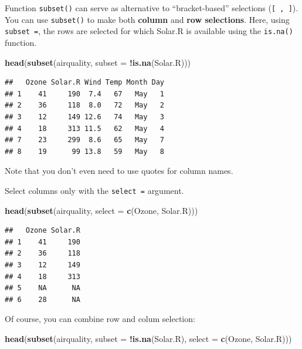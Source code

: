 \documentclass[]{book}
\newenvironment{Shaded}{\begin{snugshade}}{\end{snugshade}}
\newcommand{\DataTypeTok}[1]{\textcolor[rgb]{0.13,0.29,0.53}{#1}}
\newcommand{\KeywordTok}[1]{\textcolor[rgb]{0.13,0.29,0.53}{\textbf{#1}}}
\newcommand{\NormalTok}[1]{#1}
\newcommand{\OperatorTok}[1]{\textcolor[rgb]{0.81,0.36,0.00}{\textbf{#1}}}
\begin{document}
Function \texttt{subset()} can serve as alternative to ``bracket-based'' selections (\texttt{{[}\ ,\ {]}}).
You can use \texttt{subset()} to make both \textbf{column} and \textbf{row selections}. Here, using \texttt{subset\ =}, the rows are selected for which Solar.R is available using the \texttt{is.na()} function.

\begin{Shaded}
\begin{Highlighting}[]
\KeywordTok{head}\NormalTok{(}\KeywordTok{subset}\NormalTok{(airquality, }\DataTypeTok{subset =} \OperatorTok{!}\KeywordTok{is.na}\NormalTok{(Solar.R)))}
\end{Highlighting}
\end{Shaded}

\begin{verbatim}
##   Ozone Solar.R Wind Temp Month Day
## 1    41     190  7.4   67   May   1
## 2    36     118  8.0   72   May   2
## 3    12     149 12.6   74   May   3
## 4    18     313 11.5   62   May   4
## 7    23     299  8.6   65   May   7
## 8    19      99 13.8   59   May   8
\end{verbatim}

Note that you don't even need to use quotes for column names.

Select columns only with the \texttt{select\ =} argument.

\begin{Shaded}
\begin{Highlighting}[]
\KeywordTok{head}\NormalTok{(}\KeywordTok{subset}\NormalTok{(airquality, }\DataTypeTok{select =} \KeywordTok{c}\NormalTok{(Ozone, Solar.R)))}
\end{Highlighting}
\end{Shaded}

\begin{verbatim}
##   Ozone Solar.R
## 1    41     190
## 2    36     118
## 3    12     149
## 4    18     313
## 5    NA      NA
## 6    28      NA
\end{verbatim}

Of course, you can combine row and colum selection:

\begin{Shaded}
\begin{Highlighting}[]
\KeywordTok{head}\NormalTok{(}\KeywordTok{subset}\NormalTok{(airquality, }
            \DataTypeTok{subset =} \OperatorTok{!}\KeywordTok{is.na}\NormalTok{(Solar.R), }
            \DataTypeTok{select =} \KeywordTok{c}\NormalTok{(Ozone, Solar.R)))}
\end{Highlighting}
\end{Shaded}
\end{document}

